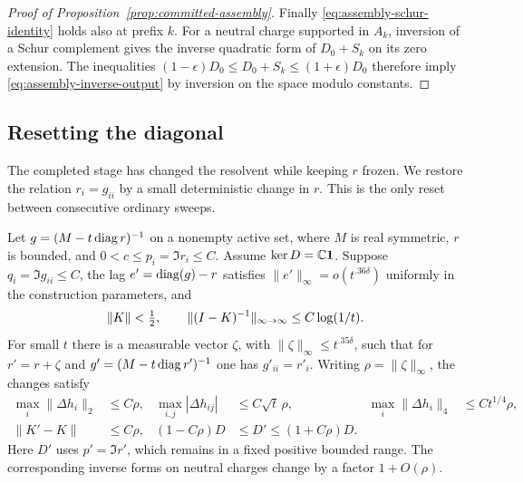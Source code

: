 \begin{proof}[Proof of Proposition~\ref{prop:committed-assembly}]
Finally \eqref{eq:assembly-schur-identity} holds also at prefix
$k$.  For a neutral charge supported in $A_k$, inversion of a
Schur complement gives the inverse quadratic form of
$D_0+S_k$ on its zero extension.  The inequalities
$(1-\epsilon)D_0\le D_0+S_k\le(1+\epsilon)D_0$ therefore imply
\eqref{eq:assembly-inverse-output} by inversion on the space
modulo constants.
\end{proof}

\subsection{Resetting the diagonal}

The completed stage has changed the resolvent while keeping $r$ frozen.
We restore the relation $r_i=g_{ii}$ by a small deterministic change in
$r$. This is the only reset between consecutive ordinary sweeps.

\begin{proposition}
\label{prop:reset}
Let $g=(M-t\operatorname{diag} r)^{-1}$ on a nonempty active set, where $M$ is real
symmetric, $r$ is bounded, and $0<c\le p_i=\Im r_i\le C$.
Assume $\ker D=\mathbb C\mathbf1$. Suppose $q_i=\Im g_{ii}\le C$, the lag
$e'=\operatorname{diag}(g)-r$ satisfies $\|e'\|_\infty=o(t^{.36\delta})$ uniformly in
the construction parameters, and
\[
 \|K\|<\tfrac12,\qquad
 \|(I-K)^{-1}\|_{\infty\to\infty}\le C\log(1/t).
\]
For small $t$ there is a measurable vector $\zeta$, with
$\|\zeta\|_\infty\le t^{.35\delta}$, such that for $r'=r+\zeta$ and
$g'=(M-t\operatorname{diag} r')^{-1}$ one has $g'_{ii}=r'_i$.
Writing $\rho=\|\zeta\|_\infty$, the changes satisfy
\begin{align}
 \max_i\|\Delta h_i\|_2&\le C\rho,
 &\max_{i,j}|\Delta h_{ij}|&\le C\sqrt t\,\rho,
 &\max_i\|\Delta h_i\|_4&\le Ct^{1/4}\rho,
 \label{eq:assembly-reset-rows}\\
 \|K'-K\|&\le C\rho,
 &(1-C\rho)D&\le D'\le(1+C\rho)D.
 \label{eq:assembly-reset-forms}
\end{align}
Here $D'$ uses $p'=\Im r'$, which remains in a fixed positive bounded
range. The corresponding inverse forms on neutral charges change by
a factor $1+O(\rho)$.
\end{proposition}

